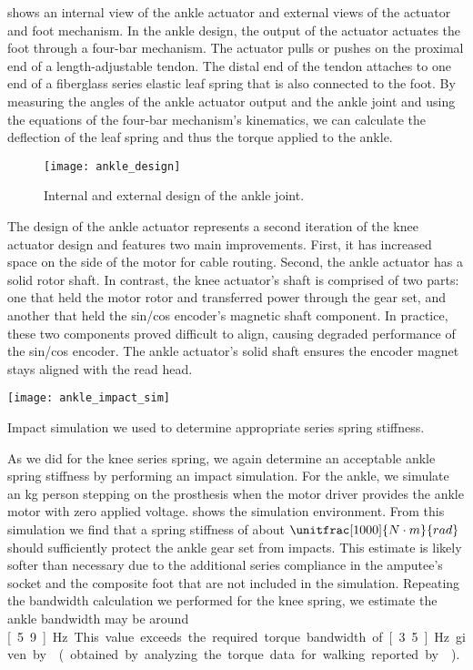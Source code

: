  shows an internal view of the ankle actuator and
external views of the actuator and foot mechanism. In the ankle design, the
output of the actuator actuates the foot through a four-bar mechanism. The
actuator pulls or pushes on the proximal end of a length-adjustable tendon. The
distal end of the tendon attaches to one end of a fiberglass series elastic leaf
spring that is also connected to the foot. By measuring the angles of the ankle
actuator output and the ankle joint and using the equations of the four-bar
mechanism's kinematics, we can calculate the deflection of the leaf spring and
thus the torque applied to the ankle.
\begin{figure*}[b!]
    \centering 
    \texttt{[image: ankle\_design]}
    \caption{Internal and external design of the ankle 
    joint.}\label{fig:ankle_design}
\end{figure*}

The design of the ankle actuator represents a second iteration of the knee
actuator design and features two main improvements.  First, it has increased
space on the side of the motor for cable routing. Second, the ankle actuator has
a solid rotor shaft. In contrast, the knee actuator's shaft is comprised of two
parts: one that held the motor rotor and transferred power through the gear set,
and another that held the sin/cos encoder's magnetic shaft component. In
practice, these two components proved difficult to align, causing degraded
performance of the sin/cos encoder. The ankle actuator's solid shaft ensures the
encoder magnet stays aligned with the read head.

\begin{marginfigure}[-0.0in]
    \centering 
    \texttt{[image: ankle\_impact\_sim]}
    \caption{Impact simulation we used to determine appropriate series spring
    stiffness.}\label{fig:ankle_impact_sim}
\end{marginfigure}
As we did for the knee series spring, we again determine an acceptable ankle
spring stiffness by performing an impact simulation. For the ankle, we simulate
an \unit[80]{kg} person stepping on the prosthesis when the motor driver
provides the ankle motor with zero applied voltage. 
shows the simulation environment. From this simulation we find that a spring
stiffness of about $\unitfrac[1000]{N \cdot m}{rad}$ should sufficiently protect
the ankle gear set from impacts. This estimate is likely softer than necessary
due to the additional series compliance in the amputee's socket and the
composite foot that are not included in the simulation.
Repeating the bandwidth calculation we performed for the knee spring, we
estimate the ankle bandwidth may be around \unit[5.9]{Hz}. This value exceeds
the required torque bandwidth of \unit[3.5]{Hz} given by \citet{au2008powered}
(obtained by analyzing the torque data for walking reported by
\citet{winter2009biomechanics}).
